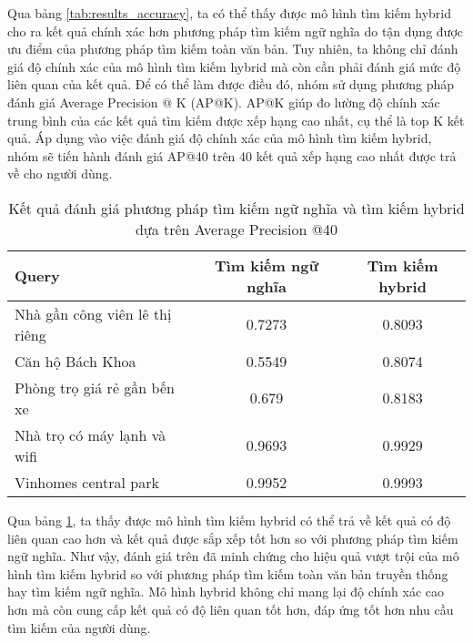 \hspace*{1cm}Qua bảng \ref{tab:results_accuracy}, ta có thể thấy được mô hình tìm kiếm hybrid cho ra kết quả chính xác hơn phương pháp tìm kiếm ngữ nghĩa do tận dụng được ưu điểm của phương pháp tìm kiếm toàn văn bản. Tuy nhiên, ta không chỉ đánh giá độ chính xác của mô hình tìm kiếm hybrid mà còn cần phải đánh giá mức độ liên quan của kết quả. Để có thể làm được điều đó, nhóm sử dụng phương pháp đánh giá Average Precision @ K (AP@K). AP@K giúp đo lường độ chính xác trung bình của các kết quả tìm kiếm được xếp hạng cao nhất, cụ thể là top K kết quả. Áp dụng vào việc đánh giá độ chính xác của mô hình tìm kiếm hybrid, nhóm sẽ tiến hành đánh giá AP@40 trên 40 kết quả xếp hạng cao nhất được trả về cho người dùng.
\begin{table}[H]
    \centering
        \caption{Kết quả đánh giá phương pháp tìm kiếm ngữ nghĩa và tìm kiếm hybrid dựa trên Average Precision @40}
    \begin{tabular}{|l|c|c|}
    \hline
        Query &  Tìm kiếm ngữ nghĩa & \textbf{Tìm kiếm hybrid} \\
        \hline
        \hline
        Nhà gần công viên lê thị riêng &  0.7273 & 0.8093 \\
        Căn hộ Bách Khoa & 0.5549 & 0.8074 \\
        Phòng trọ giá rẻ gần bến xe & 0.679 & 0.8183 \\
        Nhà trọ có máy lạnh và wifi & 0.9693 & 0.9929 \\
        Vinhomes central park & 0.9952 & 0.9993 \\
\hline
    \end{tabular}
    \label{tab:results_apk}
\end{table}
\hspace*{1cm}Qua bảng \ref{tab:results_apk}, ta thấy được mô hình tìm kiếm hybrid có thể trả về kết quả có độ liên quan cao hơn và kết quả được sắp xếp tốt hơn so với phương pháp tìm kiếm ngữ nghĩa. Như vậy, đánh giá trên đã minh chứng cho hiệu quả vượt trội của mô hình tìm kiếm hybrid so với phương pháp tìm kiếm toàn văn bản truyền thống hay tìm kiếm ngữ nghĩa. Mô hình hybrid không chỉ mang lại độ chính xác cao hơn mà còn cung cấp kết quả có độ liên quan tốt hơn, đáp ứng tốt hơn nhu cầu tìm kiếm của người dùng.
\hspace*{1cm}